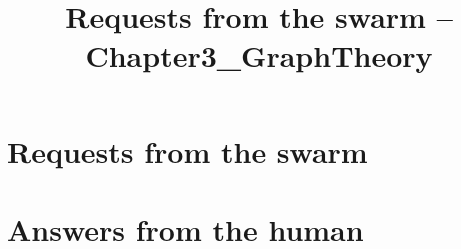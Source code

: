 \documentclass[12pt, a4paper]{scrartcl}
\title{Requests from the swarm -- Chapter3_GraphTheory}
\begin{document}
\maketitle

\section*{Requests from the swarm}

\section*{Answers from the human}
\end{document}
